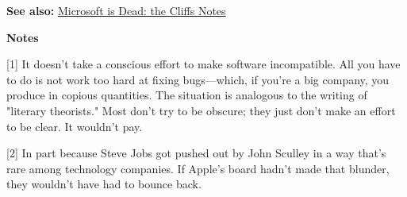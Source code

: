 \textbf{See also:} \href{http://www.paulgraham.com/cliffsnotes.html}{Microsoft is Dead: the Cliffs Notes}

\textbf{Notes}

[1]
It doesn't take a conscious effort to make software incompatible.
All you have to do is not work too hard at fixing bugs---which, if
you're a big company, you produce in copious quantities.  The
situation is analogous to the writing of "literary
theorists."  Most don't try to be obscure; they just don't make an
effort to be clear.  It wouldn't pay.

[2]
In part because Steve Jobs got pushed out by John Sculley in
a way that's rare among technology companies.  If Apple's board
hadn't made that blunder, they wouldn't have had to bounce back.


